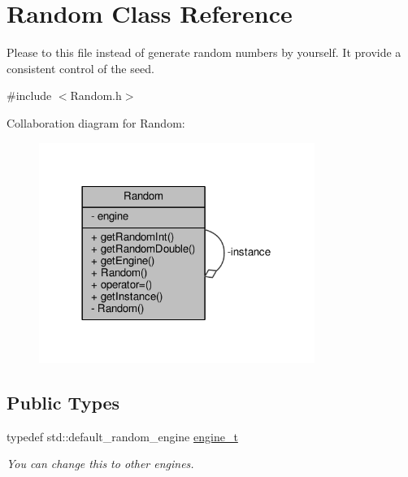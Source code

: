 \hypertarget{classRandom}{}\section{Random Class Reference}
\label{classRandom}


Please to this file instead of generate random numbers by yourself. It provide a consistent control of the seed.  




{\ttfamily \#include $<$Random.\+h$>$}



Collaboration diagram for Random\+:\nopagebreak
\begin{figure}[H]
\begin{center}
\leavevmode
\includegraphics[width=254pt]{classRandom__coll__graph}
\end{center}
\end{figure}
\subsection*{Public Types}
\begin{DoxyCompactItemize}
\item 
typedef std\+::default\+\_\+random\+\_\+engine \hyperlink{classRandom_ab1090b767f3e771eb8f846079869d1b4}{engine\+\_\+t}
\begin{DoxyCompactList}\small\item\em You can change this to other engines. \end{DoxyCompactList}\end{DoxyCompactItemize}
